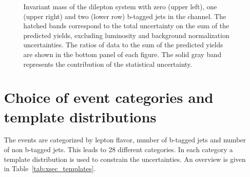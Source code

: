 \begin{figure}[htbp!]
\begin{center}
      \caption{Invariant mass of the dilepton system with zero (upper left), one (upper right) and two (lower row) b-tagged 
      jets in the \emu channel. The hatched
        bands correspond to the total uncertainty on the sum of the
        predicted yields, excluding luminosity and background
        normalization uncertainties. 
        The ratios of data to the sum of the predicted yields are
        shown in the bottom panel of each figure. The solid gray band
        represents the contribution of the statistical uncertainty.}  
       \label{fig:xsec_ctrplots_mll}
  \end{center}
\end{figure}



\section{Choice of event categories and template distributions}
\label{sec:xsec_templates}

The events are categorized by lepton flavor, number of b-tagged jets and number of non b-tagged jets. This leads to 28 different categories.
In each category a template distribution is used to constrain the uncertainties.
An overview is given in Table~\ref{tab:xsec_templates}.

